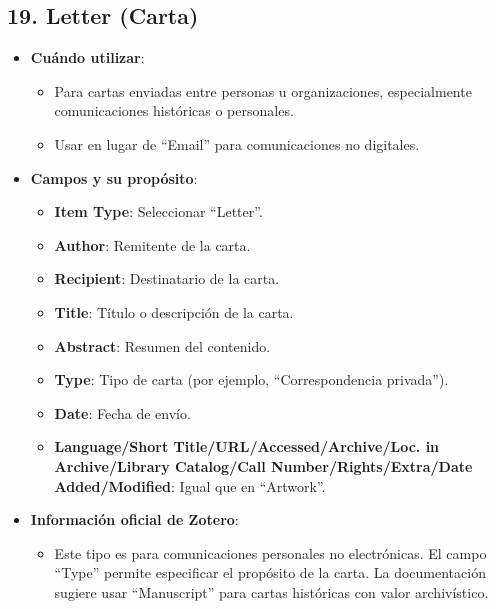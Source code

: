 \documentclass[
  jou,
  floatsintext,
  longtable,
  a4paper,
  nolmodern,
  notxfonts,
  notimes,
  colorlinks=true,linkcolor=blue,citecolor=blue,urlcolor=blue]{apa7}
\providecommand{\tightlist}{%
  \setlength{\itemsep}{0pt}\setlength{\parskip}{0pt}}
\begin{document}
\subsection{19. Letter (Carta)}\label{letter-carta}

\begin{itemize}
\tightlist
\item
  \textbf{Cuándo utilizar}:

  \begin{itemize}
  \tightlist
  \item
    Para cartas enviadas entre personas u organizaciones, especialmente
    comunicaciones históricas o personales.
  \item
    Usar en lugar de ``Email'' para comunicaciones no digitales.
  \end{itemize}
\item
  \textbf{Campos y su propósito}:

  \begin{itemize}
  \tightlist
  \item
    \textbf{Item Type}: Seleccionar ``Letter''.
  \item
    \textbf{Author}: Remitente de la carta.
  \item
    \textbf{Recipient}: Destinatario de la carta.
  \item
    \textbf{Title}: Título o descripción de la carta.
  \item
    \textbf{Abstract}: Resumen del contenido.
  \item
    \textbf{Type}: Tipo de carta (por ejemplo, ``Correspondencia
    privada'').
  \item
    \textbf{Date}: Fecha de envío.
  \item
    \textbf{Language/Short Title/URL/Accessed/Archive/Loc. in
    Archive/Library Catalog/Call Number/Rights/Extra/Date
    Added/Modified}: Igual que en ``Artwork''.
  \end{itemize}
\item
  \textbf{Información oficial de Zotero}:

  \begin{itemize}
  \tightlist
  \item
    Este tipo es para comunicaciones personales no electrónicas. El
    campo ``Type'' permite especificar el propósito de la carta. La
    documentación sugiere usar ``Manuscript'' para cartas históricas con
    valor archivístico.
  \end{itemize}
\end{itemize}
\end{document}
